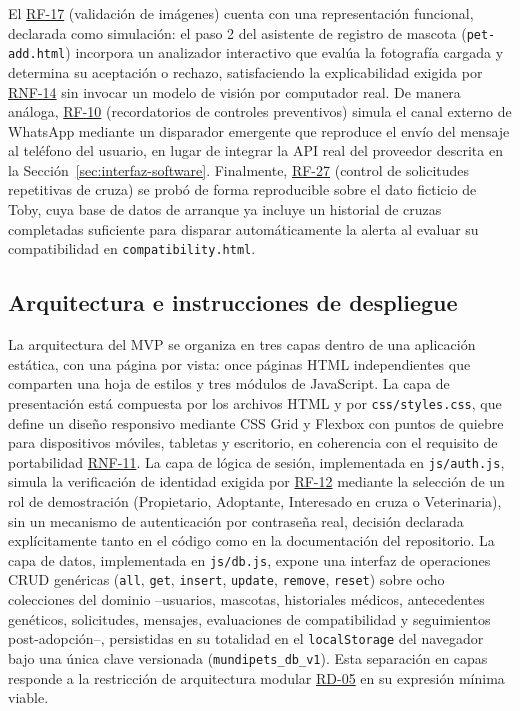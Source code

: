 \documentclass[journal,onecolumn]{IEEEtran}
\begin{document}
	El \hyperref[tab:RF-17]{RF-17} (validación de imágenes) cuenta con una representación funcional,
	declarada como simulación: el paso 2 del asistente de registro de mascota
	(\texttt{pet-add.html}) incorpora un analizador interactivo que evalúa la
	fotografía cargada y determina su aceptación o rechazo, satisfaciendo la
	explicabilidad exigida por \hyperref[tab:RNF-14]{RNF-14} sin invocar un modelo de visión por
	computador real. De manera análoga, \hyperref[tab:RF-10]{RF-10} (recordatorios de controles
	preventivos) simula el canal externo de WhatsApp mediante un disparador
	emergente que reproduce el envío del mensaje al teléfono del usuario, en
	lugar de integrar la API real del proveedor descrita en la
	Sección~\ref{sec:interfaz-software}. Finalmente, \hyperref[tab:RF-27]{RF-27} (control de
	solicitudes repetitivas de cruza) se probó de forma reproducible sobre el
	dato ficticio de Toby, cuya base de datos de arranque ya incluye un
	historial de cruzas completadas suficiente para disparar automáticamente
	la alerta al evaluar su compatibilidad en \texttt{compatibility.html}.
	
	\subsection{Arquitectura e instrucciones de despliegue}
	\label{sec:mvp-arquitectura}
	
	La arquitectura del MVP se organiza en tres capas dentro de una aplicación
	estática, con una página por vista: once páginas HTML independientes que
	comparten una hoja de estilos y tres módulos de JavaScript. La capa de
	presentación está compuesta por los archivos HTML y por
	\texttt{css/styles.css}, que define un diseño responsivo mediante CSS Grid
	y Flexbox con puntos de quiebre para dispositivos móviles, tabletas y
	escritorio, en coherencia con el requisito de portabilidad \hyperref[tab:RNF-11]{RNF-11}. La capa
	de lógica de sesión, implementada en \texttt{js/auth.js}, simula la
	verificación de identidad exigida por \hyperref[tab:RF-12]{RF-12} mediante la selección de un rol
	de demostración (Propietario, Adoptante, Interesado en cruza o
	Veterinaria), sin un mecanismo de autenticación por contraseña real,
	decisión declarada explícitamente tanto en el código como en la
	documentación del repositorio. La capa de datos, implementada en
	\texttt{js/db.js}, expone una interfaz de operaciones CRUD genéricas
	(\texttt{all}, \texttt{get}, \texttt{insert}, \texttt{update},
	\texttt{remove}, \texttt{reset}) sobre ocho colecciones del dominio
	--usuarios, mascotas, historiales médicos, antecedentes genéticos,
	solicitudes, mensajes, evaluaciones de compatibilidad y seguimientos
	post-adopción--, persistidas en su totalidad en el \texttt{localStorage}
	del navegador bajo una única clave versionada
	(\texttt{mundipets\_db\_v1}). Esta separación en capas responde a la
	restricción de arquitectura modular \hyperref[tab:RD-05]{RD-05} en su expresión mínima viable.
	
\end{document}
